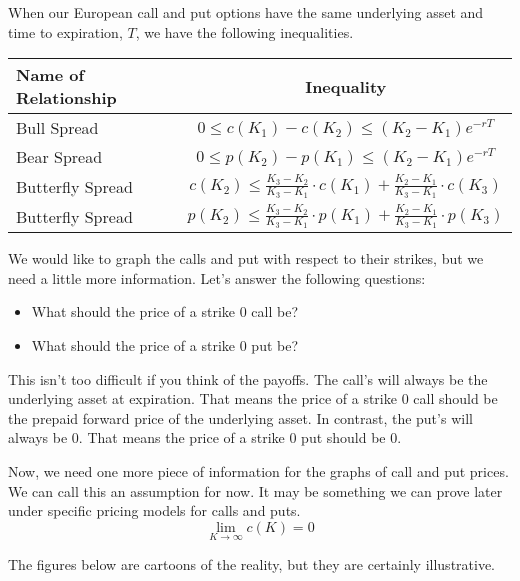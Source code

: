 \documentclass{ximera}
\begin{document}
\begin{theorem}[Inequalities]
When our European call and put options have the same underlying asset and time to expiration, $T$, we have the following inequalities.
\end{theorem}
\begin{center}
	\renewcommand{\arraystretch}{1.8}
	\begin{tabular}{lc}
	Name of Relationship & Inequality\\
	\hline
	Bull Spread & $0\leq c(K_1)-c(K_2)\leq (K_2-K_1)e^{-rT}$\\
	Bear Spread & $0\leq p(K_2)-p(K_1)\leq (K_2-K_1)e^{-rT}$\\
	Butterfly Spread & $c(K_2)\leq \frac{K_3-K_2}{K_3-K_1}\cdot c(K_1)+\frac{K_2-K_1}{K_3-K_1}\cdot c(K_3)$\\
	Butterfly Spread & $p(K_2)\leq \frac{K_3-K_2}{K_3-K_1}\cdot p(K_1)+\frac{K_2-K_1}{K_3-K_1}\cdot p(K_3)$
	\end{tabular}
\end{center}

We would like to graph the calls and put with respect to their strikes, but we need a little more information. Let's answer the following questions:
\begin{itemize}
	\item What should the price of a strike $0$ call be?
	\item What should the price of a strike $0$ put be?
\end{itemize}

This isn't too difficult if you think of the payoffs. The call's will always be the underlying asset at expiration. That means the price of a strike $0$ call should be the prepaid forward price of the underlying asset. In contrast, the put's will always be $0$. That means the price of a strike $0$ put should be $0$. 

Now, we need one more piece of information for the graphs of call and put prices. We can call this an assumption for now. It may be something we can prove later under specific pricing models for calls and puts. 
\[
\lim_{K\to\infty}c(K)=0
\]

The figures below are cartoons of the reality, but they are certainly illustrative.
\end{document}
